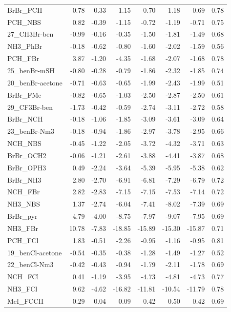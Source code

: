 \documentclass[journal=jcisd8,manuscript=suppinfo]{achemso}
\begin{document}
\begin{singlespace}
{\begin{longtable}{lrrrrrrr}
BrBr\_PCH & 0.78 & -0.33 & -1.15 & -0.70 & -1.18 & -0.69 & 0.78\\
PCH\_NBS & 0.82 & -0.39 & -1.15 & -0.72 & -1.19 & -0.71 & 0.75\\
27\_CH3Br-ben & -0.99 & -0.16 & -0.35 & -1.50 & -1.81 & -1.49 & 0.68\\
NH3\_PhBr & -0.18 & -0.62 & -0.80 & -1.60 & -2.02 & -1.59 & 0.56\\
PCH\_FBr & 3.87 & -1.20 & -4.35 & -1.68 & -2.07 & -1.68 & 0.78\\
25\_benBr-mSH & -0.80 & -0.28 & -0.79 & -1.86 & -2.32 & -1.85 & 0.74\\
20\_benBr-acetone & -0.71 & -0.63 & -0.65 & -1.99 & -2.43 & -1.99 & 0.51\\
BrBr\_FMe & -0.82 & -0.65 & -1.03 & -2.50 & -2.87 & -2.50 & 0.61\\
29\_CF3Br-ben & -1.73 & -0.42 & -0.59 & -2.74 & -3.11 & -2.72 & 0.58\\
BrBr\_NCH & -0.18 & -1.06 & -1.85 & -3.09 & -3.61 & -3.09 & 0.64\\
23\_benBr-Nm3 & -0.18 & -0.94 & -1.86 & -2.97 & -3.78 & -2.95 & 0.66\\
NCH\_NBS & -0.45 & -1.22 & -2.05 & -3.72 & -4.32 & -3.71 & 0.63\\
BrBr\_OCH2 & -0.06 & -1.21 & -2.61 & -3.88 & -4.41 & -3.87 & 0.68\\
BrBr\_OPH3 & 0.49 & -2.24 & -3.64 & -5.39 & -5.95 & -5.38 & 0.62\\
BrBr\_NH3 & 2.80 & -2.70 & -6.91 & -6.81 & -7.29 & -6.79 & 0.72\\
NCH\_FBr & 2.82 & -2.83 & -7.15 & -7.15 & -7.53 & -7.14 & 0.72\\
NH3\_NBS & 1.37 & -2.74 & -6.04 & -7.41 & -8.02 & -7.39 & 0.69\\
BrBr\_pyr & 4.79 & -4.00 & -8.75 & -7.97 & -9.07 & -7.95 & 0.69\\
NH3\_FBr & 10.78 & -7.83 & -18.85 & -15.89 & -15.30 & -15.87 & 0.71\\
PCH\_FCl & 1.83 & -0.51 & -2.26 & -0.95 & -1.16 & -0.95 & 0.81\\
19\_benCl-acetone & -0.54 & -0.35 & -0.38 & -1.28 & -1.49 & -1.27 & 0.52\\
22\_benCl-Nm3 & -0.42 & -0.43 & -0.94 & -1.79 & -2.11 & -1.78 & 0.69\\
NCH\_FCl & 0.41 & -1.19 & -3.95 & -4.73 & -4.81 & -4.73 & 0.77\\
NH3\_FCl & 9.62 & -4.62 & -16.82 & -11.81 & -10.54 & -11.79 & 0.78\\
MeI\_FCCH & -0.29 & -0.04 & -0.09 & -0.42 & -0.50 & -0.42 & 0.69\\

\end{longtable}}
\end{singlespace}
\end{document}
